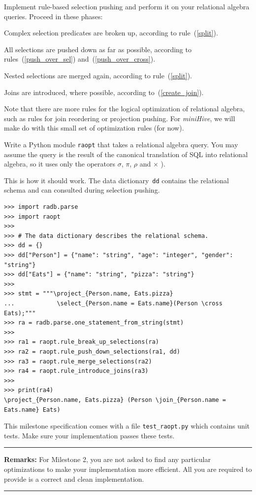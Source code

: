 \documentclass[12pt]{exam}
\begin{document}
\bigskip
Implement rule-based selection pushing and perform it on your relational algebra queries. 
Proceed in these phases:
\begin{compactenum}
    \item Complex selection predicates are broken up, according to rule~(\ref{split}).
    \item All selections are pushed down as far as possible, according to rules~(\ref{push_over_sel}) and~(\ref{push_over_cross}).
    \item Nested selections are merged again, according to rule~(\ref{split}).
    \item Joins are introduced, where possible, according to~(\ref{create_join}).

\end{compactenum}

Note that there are more rules for the logical optimization of relational algebra, such as rules for join reordering or projection pushing. For {\em miniHive}\/, we will make do with this small set of optimization rules (for now). 



\newpage %
\noindent
Write a Python module \verb!raopt! that takes a relational algebra query. You may assume the query is the result of the canonical translation of SQL into relational algebra, so it uses only the operators $\sigma$, $\pi$, $\rho$ and $\times$ ). 

This is how it should work. The data dictionary~\verb!dd! contains the relational schema and can consulted during selection pushing.

\begin{Verbatim}[frame=single,fontsize=\small]
>>> import radb.parse
>>> import raopt
>>>
>>> # The data dictionary describes the relational schema.
>>> dd = {}
>>> dd["Person"] = {"name": "string", "age": "integer", "gender": "string"}
>>> dd["Eats"] = {"name": "string", "pizza": "string"}
>>>
>>> stmt = """\project_{Person.name, Eats.pizza}
...            \select_{Person.name = Eats.name}(Person \cross Eats);"""
>>> ra = radb.parse.one_statement_from_string(stmt)
>>>
>>> ra1 = raopt.rule_break_up_selections(ra)
>>> ra2 = raopt.rule_push_down_selections(ra1, dd)
>>> ra3 = raopt.rule_merge_selections(ra2)
>>> ra4 = raopt.rule_introduce_joins(ra3)
>>>
>>> print(ra4)
\project_{Person.name, Eats.pizza} (Person \join_{Person.name = Eats.name} Eats)
\end{Verbatim}

\noindent
This milestone specification comes with a file \verb!test_raopt.py! which contains unit tests. Make sure your implementation passes these tests.


\bigskip
\noindent
\rule{\linewidth}{0.5mm}

{\bf Remarks:}
For Milestone 2, you are not asked to find any particular optimizations to make your implementation more efficient. All you are required to provide is a correct and clean implementation.

\noindent
\rule{\linewidth}{0.5mm}
\end{document}
